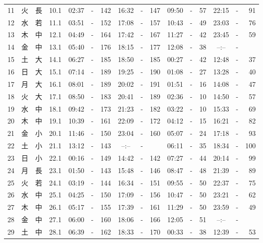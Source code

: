 \documentclass[12pt.a4j]{jsarticle}
\begin{document}
\begin{center}
\begin{table}[ht]
\begin{tabular}{|rc|cr|ccrccr|ccrccr|}
11 & 火 & 長 & 10.1 &  02:37 &-& 142  &  16:32 &-& 147  &   09:50 &-&  57  &   22:15 &-&  91  \\
12 & 水 & 若 & 11.1 &  03:51 &-& 152  &  17:08 &-& 157  &   10:43 &-&  49  &   23:03 &-&  76  \\
13 & 木 & 中 & 12.1 &  04:49 &-& 164  &  17:42 &-& 167  &   11:27 &-&  42  &   23:45 &-&  59  \\
14 & 金 & 中 & 13.1 &  05:40 &-& 176  &  18:15 &-& 177  &   12:08 &-&  38  &   --:-- &-&     \\
15 & 土 & 大 & 14.1 &  06:27 &-& 185  &  18:50 &-& 185  &   00:27 &-&  42  &   12:48 &-&  37  \\
16 & 日 & 大 & 15.1 &  07:14 &-& 189  &  19:25 &-& 190  &   01:08 &-&  27  &   13:28 &-&  40  \\
17 & 月 & 大 & 16.1 &  08:01 &-& 189  &  20:02 &-& 191  &   01:51 &-&  16  &   14:08 &-&  47  \\
18 & 火 & 大 & 17.1 &  08:50 &-& 183  &  20:41 &-& 189  &   02:36 &-&  10  &   14:50 &-&  57  \\
19 & 水 & 中 & 18.1 &  09:42 &-& 173  &  21:23 &-& 182  &   03:22 &-&  10  &   15:33 &-&  69  \\
20 & 木 & 中 & 19.1 &  10:39 &-& 161  &  22:09 &-& 172  &   04:12 &-&  15  &   16:21 &-&  82  \\
21 & 金 & 小 & 20.1 &  11:46 &-& 150  &  23:04 &-& 160  &   05:07 &-&  24  &   17:18 &-&  93  \\
22 & 土 & 小 & 21.1 &  13:12 &-& 143  &  --:-- &-&     &   06:11 &-&  35  &   18:34 &-& 100  \\
23 & 日 & 小 & 22.1 &  00:16 &-& 149  &  14:42 &-& 142  &   07:27 &-&  44  &   20:14 &-&  99  \\
24 & 月 & 長 & 23.1 &  01:50 &-& 143  &  15:48 &-& 146  &   08:47 &-&  48  &   21:39 &-&  89  \\
25 & 火 & 若 & 24.1 &  03:19 &-& 144  &  16:34 &-& 151  &   09:55 &-&  50  &   22:37 &-&  75  \\
26 & 水 & 中 & 25.1 &  04:25 &-& 150  &  17:09 &-& 156  &   10:47 &-&  50  &   23:21 &-&  62  \\
27 & 木 & 中 & 26.1 &  05:17 &-& 155  &  17:39 &-& 161  &   11:29 &-&  50  &   23:59 &-&  49  \\
28 & 金 & 中 & 27.1 &  06:00 &-& 160  &  18:06 &-& 166  &   12:05 &-&  51  &   --:-- &-&     \\
29 & 土 & 中 & 28.1 &  06:39 &-& 162  &  18:33 &-& 170  &   00:33 &-&  38  &   12:39 &-&  53  \\

\end{tabular}
\end{table}
\end{center}
\end{document}
